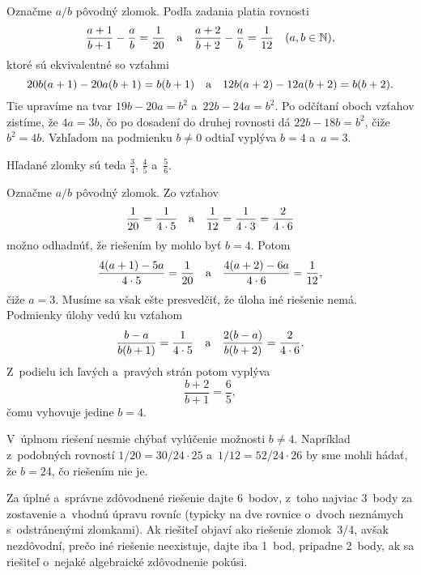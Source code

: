 {%
Označme $a/b$ pôvodný zlomok. Podľa zadania platia rovnosti
$$
{a+1\over b+1}-{a\over b}={1\over 20}
\quad\text a\quad
{a+2\over b+2}-{a\over b}={1\over 12}
\quad(a,b\in\Bbb N),
$$
ktoré sú ekvivalentné so vzťahmi
$$
20b(a + 1) - 20a(b + 1) = b(b + 1)
\quad\text a\quad
12b(a + 2) - 12a(b + 2) = b(b + 2).
$$
Tie upravíme na tvar $19b - 20a = b^2$ a~$22b - 24a = b^2$.
Po odčítaní oboch vzťahov zistíme, že $4a = 3b$, čo po dosadení
do druhej rovnosti dá $22b - 18b =b^{2}$, čiže $b^2=4b$.
Vzhľadom na podmienku $b\ne0$ odtiaľ vyplýva $b = 4$ a~$a = 3$.

Hľadané zlomky sú teda $\frac34$, $\frac45$ a~$\frac56$.



\ineriesenie
Označme $a/b$ pôvodný zlomok. Zo vzťahov
$$
\frac1{20}=\frac1{4\cdot5}
\quad\text a\quad
\frac1{12}=\frac1{4\cdot3}=\frac2{4\cdot6}
$$
možno odhadnúť, že riešením by mohlo byť $b = 4$. Potom
$$
{4(a+1)-5a\over 4\cdot5}=\frac1{20}\quad\text a\quad
{4(a+2)-6a\over 4\cdot6}=\frac1{12},
$$
čiže $a = 3$.
Musíme sa však ešte presvedčiť, že úloha iné riešenie nemá.
Podmienky úlohy vedú ku vzťahom
$$
\frac{b-a}{b(b +1)}=\frac1{4\cdot5}
\quad\text a\quad
\frac{2(b-a)}{b(b +2)}=\frac2{4\cdot6}.
$$
Z~podielu ich ľavých a~pravých strán potom vyplýva
$$
\frac{b +2}{b+1}=\frac65,
$$
čomu vyhovuje jedine $b=4$.


\poznamka
V~úplnom riešení nesmie chýbať vylúčenie možnosti $b\ne4$.
Napríklad z~podobných rovností $1/20=30/24\cdot25$ a~$1/12=52/24\cdot26$
by sme mohli hádať, že $b=24$, čo riešením nie je.

\nobreak\medskip\petit\noindent
Za úplné a~správne zdôvodnené riešenie dajte 6~bodov, z~toho najviac
3~body za zostavenie a~vhodnú úpravu rovníc (typicky na dve rovnice o~dvoch neznámych
s~odstránenými zlomkami).
Ak riešiteľ objaví ako riešenie zlomok~3/4,
avšak nezdôvodní, prečo iné riešenie neexistuje, dajte iba 1~bod, pripadne
2~body, ak sa riešiteľ o~nejaké algebraické zdôvodnenie pokúsi.
\endpetit
\bigbreak
}

